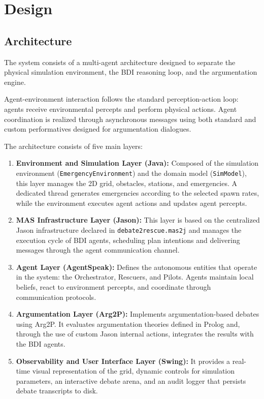 \section{Design}
\label{sec:design}

\subsection{Architecture}
\label{subsec:architecture}

The system consists of a multi-agent architecture designed to separate the physical simulation environment, the BDI reasoning loop, and the argumentation engine.

Agent-environment interaction follows the standard perception-action loop: agents receive environmental percepts and perform physical actions.
Agent coordination is realized through asynchronous messages using both standard and custom performatives designed for argumentation dialogues.

The architecture consists of five main layers:
\begin{enumerate}
    \item \textbf{Environment and Simulation Layer (Java):} Composed of the simulation environment (\texttt{EmergencyEnvironment}) and the domain model (\texttt{SimModel}), this layer manages the 2D grid, obstacles, stations, and emergencies. A dedicated thread generates emergencies according to the selected spawn rates, while the environment executes agent actions and updates agent percepts.
    
    \item \textbf{MAS Infrastructure Layer (Jason):} This layer is based on the centralized Jason infrastructure declared in \texttt{debate2rescue.mas2j} and manages the execution cycle of BDI agents, scheduling plan intentions and delivering messages through the agent communication channel.
    
    \item \textbf{Agent Layer (AgentSpeak):} Defines the autonomous entities that operate in the system: the Orchestrator, Rescuers, and Pilots. Agents maintain local beliefs, react to environment percepts, and coordinate through communication protocols.
    
    \item \textbf{Argumentation Layer (Arg2P):} Implements argumentation-based debates using Arg2P. It evaluates argumentation theories defined in Prolog and, through the use of custom Jason internal actions, integrates the results with the BDI agents.
    
    \item \textbf{Observability and User Interface Layer (Swing):} It provides a real-time visual representation of the grid, dynamic controls for simulation parameters, an interactive debate arena, and an audit logger that persists debate transcripts to disk.
\end{enumerate}

